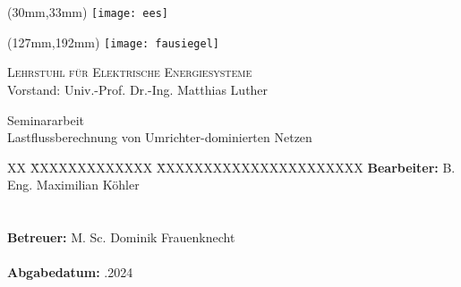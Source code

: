 \thispagestyle{empty}
\setcounter{page}{-1}

\begin{textblock*}{\textwidth}(30mm,33mm)
\texttt{[image: ees]}
\end{textblock*}

\begin{textblock*}{\textwidth}(127mm,192mm)
\texttt{[image: fausiegel]}
\end{textblock*}

{\raggedleft
\textsc{Lehrstuhl für Elektrische Energiesysteme}\\
Vorstand: Univ.-Prof. Dr.-Ing. Matthias Luther
\par}

\vspace{51mm}

{\centering

\large{Seminararbeit} \\	
\Large{Lastflussberechnung von Umrichter-dominierten Netzen}

\par}

\vspace{105mm}

{\raggedright
\begin{tabbing}
XX \= XXXXXXXXXXXXX \= XXXXXXXXXXXXXXXXXXXXXX \kill
		\> \textbf{Bearbeiter:} 	\> B. Eng. Maximilian Köhler \\
		\>								\\
 		\>												\>									\\
		\> \textbf{Betreuer:}		\> M. Sc. Dominik Frauenknecht \\
		\>												\>									\\
		\> \textbf{Abgabedatum:}	.2024															
\end{tabbing}
\par}
\cleardoublepage